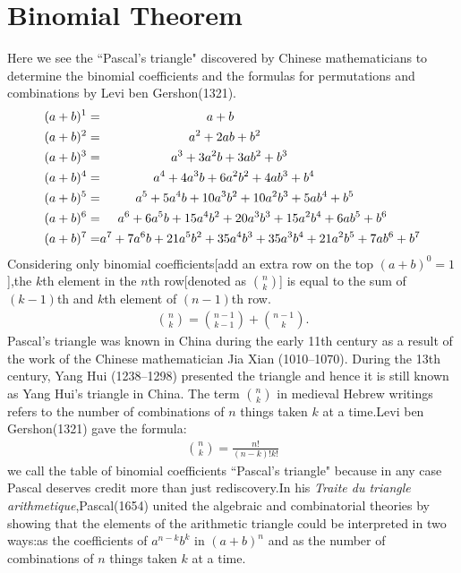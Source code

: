 \documentclass[a4paper,reqno,11pt]{book}
\theoremstyle{plain}%
\theoremstyle{definition}
\begin{document}
\section{Binomial Theorem}
Here we see the ``Pascal's triangle" discovered by Chinese mathematicians to determine the binomial coefficients and the formulas for permutations and combinations by Levi ben Gershon(1321).
\begin{align*}
    (a+b)^{1}=&\hspace{3cm}a+b\\
    (a+b)^{2}=&\hspace{2.5cm}a^2+2ab+b^2\\
    (a+b)^{3}=&\hspace{2cm}a^3+3a^2b+3ab^2+b^3\\
    (a+b)^{4}=&\hspace{1.5cm}a^4+4a^3b+6a^2b^2+4ab^3+b^4\\
    (a+b)^{5}=&\hspace{1cm}a^5+5a^4b+10a^3b^2+10a^2b^3+5ab^4+b^5\\
    (a+b)^{6}=&\hspace{0.5cm}a^6+6a^5b+15a^4b^2+20a^3b^3+15a^2b^4+6ab^5+b^6\\
    (a+b)^{7}=&a^7+7a^6b+21a^5b^2+35a^4b^3+35a^3b^4+21a^2b^5+7ab^6+b^7
\end{align*}
Considering only binomial coefficients[add an extra row on the top $(a+b)^{0}=1$],the $k$th element in the $n$th row[denoted as $\binom{n}{k}$] is equal to the sum of $(k-1)$th and $k$th element of $(n-1)$th row.
\begin{eqnarray*}
    \binom{n}{k}=\binom{n-1}{k-1}+\binom{n-1}{k}.
\end{eqnarray*}
Pascal's triangle was known in China during the early 11th century as a result of the work of the Chinese mathematician Jia Xian (1010–1070). During the 13th century, Yang Hui (1238–1298) presented the triangle and hence it is still known as Yang Hui's triangle in China.\cite{ref 7}
The term $\binom{n}{k}$ in medieval Hebrew writings refers to the number of combinations of $n$ things taken $k$ at a time.Levi ben Gershon(1321) gave the formula:
\begin{eqnarray*}
    \binom{n}{k}=\frac{n!}{(n-k)!k!}
\end{eqnarray*}
we call the table of binomial coefficients ``Pascal's triangle" because in any case Pascal deserves credit more than just rediscovery.In his \textit{Traite du triangle arithmetique},Pascal(1654) united the algebraic and combinatorial theories by showing that the elements of the arithmetic triangle could be interpreted in two ways:as the coefficients of $a^{n-k}b^k$ in $(a+b)^n$ and as the number of combinations of $n$ things taken $k$ at a time.
\end{document}

